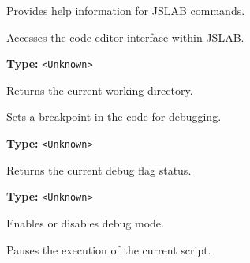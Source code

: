 \documentclass[12pt,a4paper]{article}
\begin{document}
\noindent Provides help information for JSLAB commands.

\vspace{5mm}
\noindent {}


\noindent Accesses the code editor interface within JSLAB.

\vspace{5mm}
\noindent {}\vspace{4mm}


\noindent \textbf{Type:} \texttt{<Unknown>}

\noindent Returns the current working directory.

\vspace{5mm}
\noindent {}


\noindent Sets a breakpoint in the code for debugging.

\vspace{5mm}
\noindent {}\vspace{4mm}


\noindent \textbf{Type:} \texttt{<Unknown>}

\noindent Returns the current debug flag status.

\vspace{5mm}
\noindent {}\vspace{4mm}


\noindent \textbf{Type:} \texttt{<Unknown>}

\noindent Enables or disables debug mode.

\vspace{5mm}
\noindent {}


\noindent Pauses the execution of the current script.

\vspace{5mm}
\noindent {}
\end{document}
